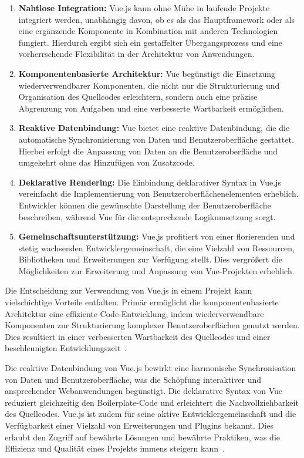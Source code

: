 \begin{enumerate}
    \item \textbf{Nahtlose Integration:} Vue.js kann ohne Mühe in laufende Projekte integriert werden, unabhängig davon,
ob es als das Hauptframework oder als eine ergänzende Komponente in Kombination mit anderen Technologien fungiert.
Hierdurch ergibt sich ein gestaffelter Übergangsprozess und eine vorherrschende Flexibilität in der Architektur von
Anwendungen.
    \item \textbf{Komponentenbasierte Architektur:} Vue begünstigt die Einsetzung wiederverwendbarer Komponenten, die
nicht nur die Strukturierung und Organisation des Quellcodes erleichtern, sondern auch eine präzise Abgrenzung von
Aufgaben und eine verbesserte Wartbarkeit ermöglichen.
    \item \textbf{Reaktive Datenbindung:} Vue bietet eine reaktive Datenbindung, die die automatische Synchronisierung
von Daten und Benutzeroberfläche gestattet. Hierbei erfolgt die Anpassung von Daten an die Benutzeroberfläche und
umgekehrt ohne das Hinzufügen von Zusatzcode.
    \item \textbf{Deklarative Rendering:} Die Einbindung deklarativer Syntax in Vue.js vereinfacht die Implementierung
von Benutzeroberflächenelementen erheblich. Entwickler können die gewünschte Darstellung der Benutzeroberfläche
beschreiben, während Vue für die entsprechende Logikumsetzung sorgt.
    \item \textbf{Gemeinschaftsunterstützung:} Vue.js profitiert von einer florierenden und stetig wachsenden
Entwicklergemeinschaft, die eine Vielzahl von Ressourcen, Bibliotheken und Erweiterungen zur Verfügung stellt. Dies
vergrößert die Möglichkeiten zur Erweiterung und Anpassung von Vue-Projekten erheblich.
\end{enumerate}

Die Entscheidung zur Verwendung von Vue.js in einem Projekt kann vielschichtige Vorteile entfalten. Primär ermöglicht
die komponentenbasierte Architektur eine effiziente Code-Entwicklung, indem wiederverwendbare Komponenten zur
Strukturierung komplexer Benutzeroberflächen genutzt werden. Dies resultiert in einer verbesserten Wartbarkeit des
Quellcodes und einer beschleunigten Entwicklungszeit~\cite{wohlgethan2018supportingweb}.

Die reaktive Datenbindung von Vue.js bewirkt eine harmonische Synchronisation von Daten und Benutzeroberfläche, was die
Schöpfung interaktiver und ansprechender Webanwendungen begünstigt. Die deklarative Syntax von Vue reduziert
gleichzeitig den Boilerplate-Code und erleichtert die Nachvollziehbarkeit des Quellcodes. Vue.js ist zudem für seine
aktive Entwicklergemeinschaft und die Verfügbarkeit einer Vielzahl von Erweiterungen und
Plugins bekannt. Dies erlaubt den Zugriff auf bewährte Lösungen und bewährte Praktiken, was die Effizienz und Qualität
eines Projekts immens steigern kann~\cite{wohlgethan2018supportingweb}.

